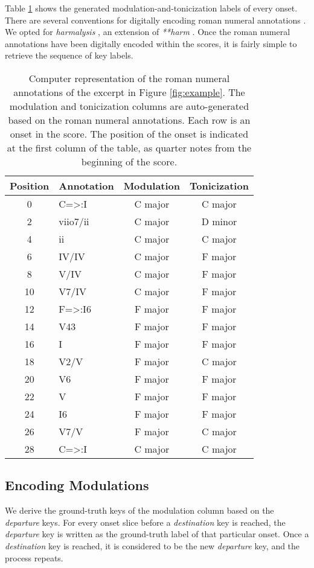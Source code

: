 \documentclass[sigconf]{acmart}
\begin{document}
Table \ref{tab:annotations} shows the generated modulation-and-tonicization labels of every onset. 
There are several conventions for digitally encoding roman numeral annotations \cite{huron_representation, Tymoczko2019, napoleslopez20harmalysis}. 
We opted for \emph{harmalysis} \cite{napoleslopez20harmalysis}, an extension of \emph{**harm} \cite{huron_representation}.
Once the roman numeral annotations have been digitally encoded within the scores, it is fairly simple to retrieve the sequence of key labels.

\begin{table}[h]
  \caption{Computer representation of the roman numeral annotations of the excerpt in Figure \ref{fig:example}. The modulation and tonicization columns are auto-generated based on the roman numeral annotations. Each row is an onset in the score. The position of the onset is indicated at the first column of the table, as quarter notes from the beginning of the score.}
  \label{tab:annotations}
  \begin{tabular}{c|lcc}
    \toprule
    Position&Annotation&Modulation&Tonicization\\
    \midrule
    0 & C=>:I & C major & C major \\
    2 & viio7/ii & C major & D minor \\
    4 & ii & C major & C major \\
    6 & IV/IV & C major & F major \\
    8 & V/IV & C major & F major \\
    10 & V7/IV & C major & F major \\
    12 & F=>:I6 & F major & F major \\
    14 & V43 & F major & F major \\
    16 & I & F major & F major \\
    18 & V2/V & F major & C major \\
    20 & V6 & F major & F major \\
    22 & V & F major & F major \\
    24 & I6 & F major & F major \\
    26 & V7/V & F major & C major \\
    28 & C=>:I & C major & C major \\
   \bottomrule
\end{tabular}
\end{table}

\subsection{Encoding Modulations}
We derive the ground-truth keys of the modulation column based on the \emph{departure} keys. 
For every onset slice before a \emph{destination} key is reached, the \emph{departure} key is written as the ground-truth label of that particular onset. 
Once a \emph{destination} key is reached, it is considered to be the new \emph{departure} key, and the process repeats. 
\end{document}
